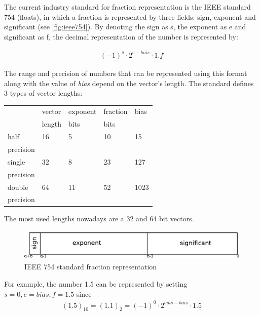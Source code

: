 \documentclass[10pt]{article}
\begin{document}
The current industry standard for fraction representation is the IEEE standard
754 (floats), in which a fraction is represented by three fields: sign, exponent
and significant (see \autoref{fig:ieee754}). By denoting the sign as s, the exponent as e and significant
as f, the decimal representation of the number is represented by:


\begin{align}
  {(-1)}^{s} \cdot 2^{e - bias} \cdot 1.f\label{eq:1}
\end{align}

\noindent The range and precision of numbers that can be represented using this format
along with the value of \textit{bias} depend on the vector's length. The
standard defines 3 types of vector lengths:

\begin{table}[h]\centering

      \begin{tabular}{|l|l|l|l|l|}
      \hline
      & vector & exponent & fraction & bias \\
      & length & bits & bits & \\
      \hline
      half & 16 & 5 & 10 & 15 \\
      precision & & & & \\
      \hline
      single & 32 & 8 & 23 & 127 \\
      precision & & & & \\
      \hline
      double & 64 & 11 & 52 & 1023 \\
      precision & & & & \\
      \hline
    \end{tabular}

\end{table}

\noindent{}The most used lengths nowadays are a 32 and 64 bit vectors.

\begin{figure}[h]
  \centering
  \includegraphics*[width=\textwidth, height=1.5cm]{ieee_754_format}
  \caption{IEEE 754 standard fraction representation}\label{fig:ieee754}
\end{figure}

\noindent{}For example, the number 1.5 can be represented by setting $s=0, e=bias, f=1.5$ since
\begin{align*}
  (1.5)_{10} = (1.1)_{2} = (-1)^{0} \cdot 2^{bias - bias} \cdot 1.5
\end{align*}
\end{document}
